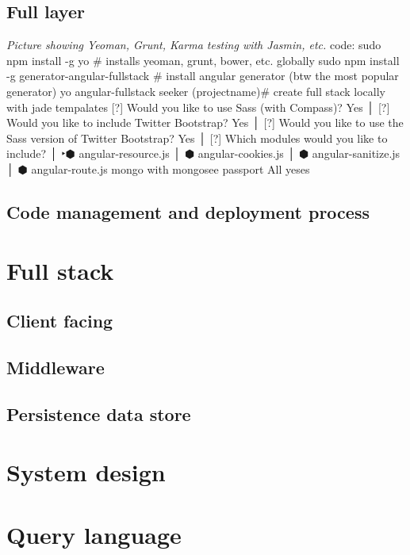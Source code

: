 \documentclass{tufte-book}
\begin{document}
\subsection{Full layer}
\emph{Picture showing Yeoman, Grunt, Karma testing with Jasmin, etc.}
code: sudo npm install -g yo \# installs yeoman, grunt, bower, etc. globally
sudo npm install -g generator-angular-fullstack \# install angular generator (btw the most popular generator)
yo angular-fullstack seeker (projectname)\# create full stack locally with jade tempalates
[?] Would you like to use Sass (with Compass)? Yes                               │
[?] Would you like to include Twitter Bootstrap? Yes                             │
[?] Would you like to use the Sass version of Twitter Bootstrap? Yes             │
[?] Which modules would you like to include?                                     │
‣⬢ angular-resource.js                                                           │
 ⬢ angular-cookies.js                                                            │
 ⬢ angular-sanitize.js                                                           │
 ⬢ angular-route.js 
 mongo with mongosee
 passport 
 All yeses
\subsection{Code management and deployment process}

\section{Full stack}
\subsection{Client facing}
\subsection{Middleware}
\subsection{Persistence data store}


\section{System design}

\section{Query language}
\end{document}
